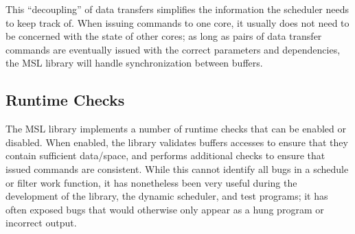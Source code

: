 This ``decoupling'' of data transfers simplifies the information the
scheduler needs to keep track of. When issuing commands to one core,
it usually does not need to be concerned with the state of other
cores; as long as pairs of data transfer commands are eventually
issued with the correct parameters and dependencies, the MSL library
will handle synchronization between buffers.

\subsection{Runtime Checks}

The MSL library implements a number of runtime checks that can be
enabled or disabled. When enabled, the library validates buffers
accesses to ensure that they contain sufficient data/space, and
performs additional checks to ensure that issued commands are
consistent. While this cannot identify all bugs in a schedule or
filter work function, it has nonetheless been very useful during the
development of the library, the dynamic scheduler, and test programs;
it has often exposed bugs that would otherwise only appear as a hung
program or incorrect output.

